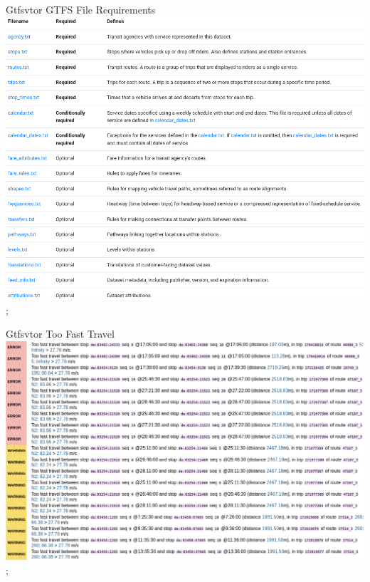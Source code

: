 \begin{frame}{Gtfsvtor GTFS File Requirements}
\includegraphics[width=\paperwidth]{gtfs-validation/gtfs-spec-file-requirements.png};
\end{frame}

\begin{frame}{Gtfsvtor Too Fast Travel}
\includegraphics[width=0.95\paperwidth]{gtfs-validation/gtfsvtor-report-vbn-top-dhid-too-fast.png};
\end{frame}
